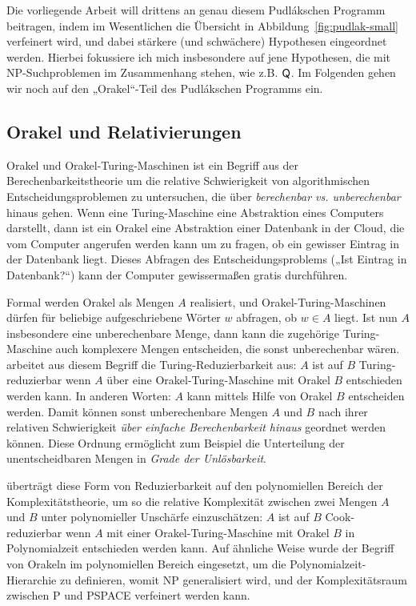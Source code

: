 Die vorliegende Arbeit will drittens an genau diesem Pudlákschen Programm beitragen, indem im Wesentlichen die Übersicht in Abbildung~\ref{fig:pudlak-small} verfeinert wird, und dabei stärkere (und schwächere) Hypothesen eingeordnet werden. Hierbei fokussiere ich mich insbesondere auf jene Hypothesen, die mit NP-Suchproblemen im Zusammenhang stehen, wie z.B. $\mathsf{Q}$.
Im Folgenden gehen wir noch auf den „Orakel“-Teil des Pudlákschen Programms ein.


\subsection*{Orakel und Relativierungen}

Orakel und Orakel-Turing-Maschinen ist ein Begriff aus der Berechenbarkeitstheorie um die relative Schwierigkeit von algorithmischen Entscheidungsproblemen zu untersuchen, die über \emph{berechenbar vs. unberechenbar} hinaus gehen. Wenn eine Turing-Maschine eine Abstraktion eines Computers darstellt, dann ist ein Orakel eine Abstraktion einer Datenbank in der Cloud, die vom Computer angerufen werden kann um zu fragen, ob ein gewisser Eintrag in der Datenbank liegt. Dieses Abfragen des Entscheidungsproblems („Ist Eintrag in Datenbank?“) kann der Computer gewissermaßen gratis durchführen.

Formal werden Orakel als Mengen $A$ realisiert, und Orakel-Turing-Maschinen dürfen für beliebige aufgeschriebene Wörter $w$ abfragen, ob $w\in A$ liegt. Ist nun $A$ insbesondere eine unberechenbare Menge, dann kann die zugehörige Turing-Maschine auch komplexere Mengen entscheiden, die sonst unberechenbar wären.
\textcite{post_recursively_1944} arbeitet aus diesem Begriff die Turing-Reduzierbarkeit aus: $A$ ist auf $B$ Turing-reduzierbar wenn $A$ über eine Orakel-Turing-Maschine mit Orakel $B$ entschieden werden kann. In anderen Worten: $A$ kann mittels Hilfe von Orakel $B$ entscheiden werden.  Damit können sonst unberechenbare Mengen $A$ und $B$ nach ihrer relativen Schwierigkeit \emph{über einfache Berechenbarkeit hinaus} geordnet werden können. Diese Ordnung ermöglicht zum Beispiel die Unterteilung der unentscheidbaren Mengen in \emph{Grade der Unlösbarkeit}.

\textcite{cook_complexity_1971} überträgt diese Form von Reduzierbarkeit auf den polynomiellen Bereich der Komplexitätstheorie, um so die relative Komplexität zwischen zwei Mengen $A$ und $B$ unter polynomieller Unschärfe einzuschätzen: $A$ ist auf $B$ Cook-reduzierbar wenn $A$ mit einer Orakel-Turing-Maschine mit Orakel $B$ in Polynomialzeit entschieden werden kann. Auf ähnliche Weise wurde der Begriff von Orakeln im polynomiellen Bereich eingesetzt, um die Polynomialzeit-Hierarchie zu definieren, womit NP generalisiert wird, und der Komplexitätsraum zwischen P und PSPACE verfeinert werden kann.

